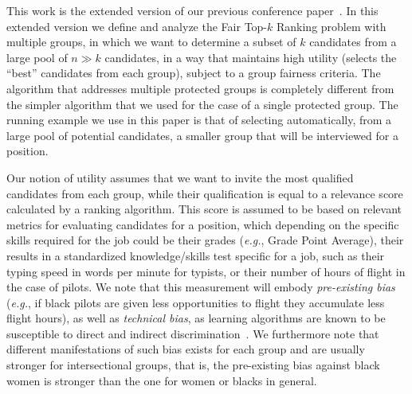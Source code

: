 This work is the extended version of our previous conference paper~\cite{zehlike2017fair}.
%
In this extended version we define and analyze the {\sc Fair Top-$k$ Ranking problem} with multiple groups, in which we want to determine a subset of $k$ candidates from a large pool of $n \gg k$ candidates, in a way that maintains high utility (selects the ``best'' candidates from each group), subject to a group fairness criteria.
%
The algorithm that addresses multiple protected groups is completely different from the simpler algorithm that we used for the case of a single protected group.
%
The running example we use in this paper is that of selecting automatically, from a large pool of potential candidates, a smaller group that will be interviewed for a position.
%

Our notion of utility assumes that we want to invite the most qualified candidates from each group, while their qualification is equal to a relevance score calculated by a ranking algorithm.
%
This score is assumed to be based on relevant metrics for evaluating candidates for a position, which depending on the specific skills required for the job could be their grades ({\em e.g.}, Grade Point Average), their results in a standardized knowledge/skills test specific for a job, such as their typing speed in words per minute for typists, or their number of hours of flight in the case of pilots.
%
We note that this measurement will embody \emph{pre-existing bias} ({\em e.g.}, if black pilots are given less opportunities to flight they accumulate less flight hours), as well as \emph{technical bias}, as learning algorithms are known to be susceptible to direct and indirect discrimination~\cite{tuto2016,HajianFerrer12}.
%
We furthermore note that different manifestations of such bias exists for each group and are usually stronger for intersectional groups, that is, the pre-existing bias against black women is stronger than the one for women or blacks in general.
%

